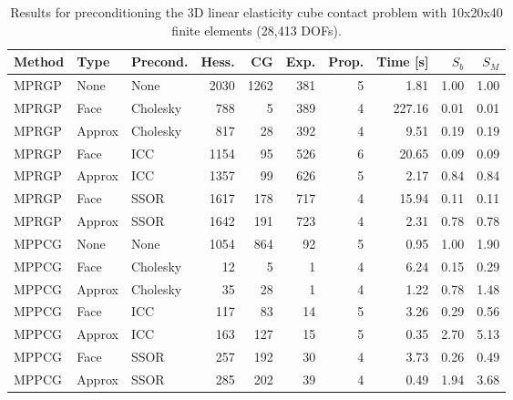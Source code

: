 \documentclass[11pt]{article}
\theoremstyle{plain}
\theoremstyle{definition}
\begin{document}
\begin{table}[htbp]
\centering
\begin{tabular}{l *{2}{|l} *{7}{|r}}
  Method & Type & Precond. & Hess. & CG & Exp. & Prop. & Time [s] & $S_b$ & $S_M$\\\hline
  MPRGP & None & None & 2030 & 1262 & 381 & 5 & 1.81 & 1.00 & 1.00\\ \hline
MPRGP & Face & Cholesky & 788 & 5 & 389 & 4 & 227.16 & 0.01 & 0.01\\
MPRGP & Approx & Cholesky & 817 & 28 & 392 & 4 & 9.51 & 0.19 & 0.19\\ \hline
MPRGP & Face & ICC & 1154 & 95 & 526 & 6 & 20.65 & 0.09 & 0.09\\
MPRGP & Approx & ICC & 1357 & 99 & 626 & 5 & 2.17 & 0.84 & 0.84\\ \hline
MPRGP & Face & SSOR & 1617 & 178 & 717 & 4 & 15.94 & 0.11 & 0.11\\
MPRGP & Approx & SSOR & 1642 & 191 & 723 & 4 & 2.31 & 0.78 & 0.78\\ \hline \hline
MPPCG & None & None & 1054 & 864 & 92 & 5 & 0.95 & 1.00 & 1.90\\ \hline
MPPCG & Face & Cholesky & 12 & 5 & 1 & 4 & 6.24 & 0.15 & 0.29\\
MPPCG & Approx & Cholesky & 35 & 28 & 1 & 4 & 1.22 & 0.78 & 1.48\\ \hline
MPPCG & Face & ICC & 117 & 83 & 14 & 5 & 3.26 & 0.29 & 0.56\\
MPPCG & Approx & ICC & 163 & 127 & 15 & 5 & 0.35 & 2.70 & 5.13\\ \hline
MPPCG & Face & SSOR & 257 & 192 & 30 & 4 & 3.73 & 0.26 & 0.49\\
MPPCG & Approx & SSOR & 285 & 202 & 39 & 4 & 0.49 & 1.94 & 3.68\\
\end{tabular}
\caption[Preconditioned 3D contact problem I.]{Results for preconditioning the 3D linear elasticity cube contact problem with 10x20x40 finite elements (28,413 DOFs).}
\label{tab:precondCube}
\end{table}
\end{document}

